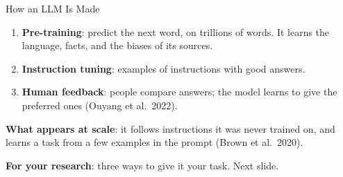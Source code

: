 \documentclass[svgnames,x11names,dvipsnames]{beamer}
\newcommand{\new}[1]{#1}
\begin{document}
\begin{frame}{\new{How an LLM Is Made}}
\small
\begin{enumerate}
    \setlength{\itemsep}{6pt}
    \item \textbf{Pre-training}: predict the next word, on trillions of words. It learns the language, facts, and the biases of its sources.
    \item \textbf{Instruction tuning}: examples of instructions with good answers.
    \item \textbf{Human feedback}: people compare answers; the model learns to give the preferred ones (Ouyang et al.\ 2022).
\end{enumerate}

\vspace{0.4cm}
\textbf{What appears at scale}: it follows instructions it was never trained on, and learns a task from a few examples in the prompt (Brown et al.\ 2020).

\vspace{0.4cm}
\textbf{For your research}: three ways to give it your task. Next slide.
\end{frame}
\end{document}
